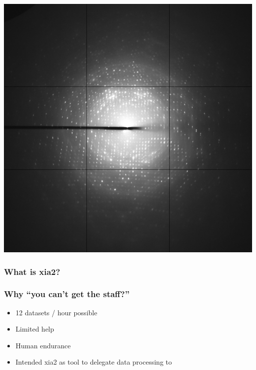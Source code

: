 \documentclass[slides,compress]{beamer}
\begin{document}
\begin{frame}
{{\includegraphics[scale=0.05]{figures/example-diffraction-image-small.jpg}
}
}
\end{frame}

\begin{frame}
\frametitle{What is xia2?}
\begin{itemize}
\end{itemize}
\end{frame}

\begin{frame}
\frametitle{Why ``you can't get the staff?''}
\begin{itemize}
\item{12 datasets / hour possible}
\item{Limited help}
\item{Human endurance}
\item{Intended xia2 as tool to delegate data processing to}
\end{itemize}
\end{frame}
\end{document}
